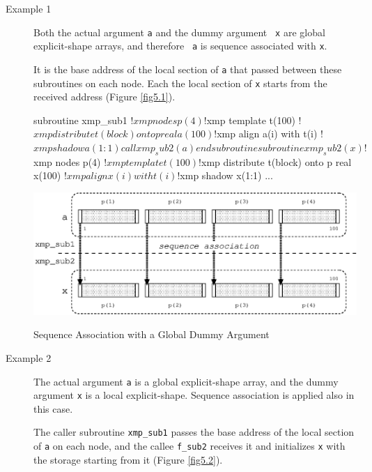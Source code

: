\begin{description}

\item[Example 1]

	   Both the actual argument {\tt a} and the dummy argument {\tt
	   x} are global explicit-shape arrays, and therefore {\tt
	   a} is sequence associated with {\tt x}.

	   It is the base address of the local section of {\tt a} that
	   passed between these subroutines on each node. Each the local
	   section of {\tt x} starts from the received address (Figure
	   \ref{fig5.1}).

\begin{Fexample}
      subroutine xmp_sub1
!$xmp nodes p(4)
!$xmp template t(100)
!$xmp distribute t(block) onto p
      real a(100)
!$xmp align a(i) with t(i)
!$xmp shadow a(1:1) 
      call xmp_sub2(a)
      end subroutine

      subroutine xmp_sub2(x)
!$xmp nodes p(4)
!$xmp template t(100)
!$xmp distribute t(block) onto p
      real x(100)
!$xmp align x(i) with t(i)
!$xmp shadow x(1:1) 
      ...
\end{Fexample}

\begin{myfigure}
 \includegraphics[scale=0.7]{figs/fig5.1.eps}
 \caption{Sequence Association with a Global Dummy Argument}
 \label{fig5.1}
\end{myfigure}

\item[Example 2]

	   The actual argument {\tt a} is a global explicit-shape array,
	   and the dummy argument {\tt x} is a local explicit-shape. 
	   Sequence association is applied also in this case.

	   The caller subroutine {\tt xmp\_sub1} passes the base address
	   of the local section of {\tt a} on each node, and the callee
	   {\tt f\_sub2} receives it and initializes {\tt x} with the
	   storage starting from it (Figure \ref{fig5.2}).


\end{description}
